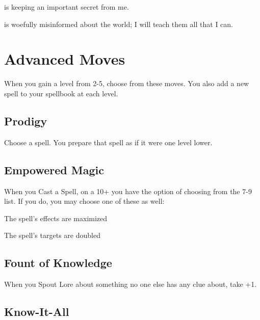  

\thinrules[2] is keeping an important secret from me.

 

\thinrules[2] is woefully misinformed about the world; I will teach them all that I can.



 
\section{Advanced Moves}    
 


\startInstructionsAfterHeader
When you gain a level from 2-5, choose from these moves. You also add a new spell to your spellbook at each level.
\stopInstructionsAfterHeader
 
\subsection{Prodigy}   
 

Choose a spell. You prepare that spell as if it were one level lower.

 
\subsection{Empowered Magic}    
 

When you Cast a Spell, on a 10+ you have the option of choosing from the 7-9 list. If you do, you may choose one of these as well:

 
\startitemize[1,packed]

\item The spell's effects are maximized

 
\item The spell's targets are doubled


\stopitemize
 
\subsection{Fount of Knowledge}    
 

When you Spout Lore about something no one else has any clue about, take +1.

 
\subsection{Know-It-All}   
 

